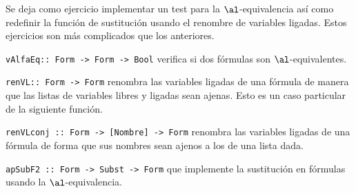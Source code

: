 \documentclass[11pt,letterpaper]{article}
\begin{document}
Se deja como ejercicio implementar un test para la $\al$-equivalencia así como 
redefinir la función de sustitución usando el renombre de variables ligadas. 
Estos ejercicios son más complicados que los anteriores.

\bi
\item \verb=vAlfaEq:: Form -> Form -> Bool= verifica si dos fórmulas son 
$\al$-equivalentes.
\item \verb=renVL:: Form -> Form= renombra las variables ligadas de una fórmula 
de manera que las listas de variables libres y ligadas sean ajenas. Esto es un 
caso particular de la siguiente función.
\item \verb=renVLconj :: Form -> [Nombre] -> Form= renombra las variables 
ligadas 
de una fórmula de forma que sus nombres sean ajenos a los de una lista dada. 
\item \verb=apSubF2 :: Form -> Subst -> Form= que implemente la sustitución en 
fórmulas usando la $\al$-equivalencia.
\ei
\end{document}
